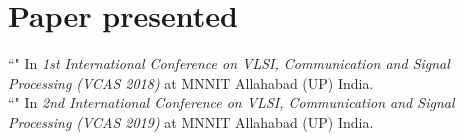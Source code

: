 \vspace{-2.5em}
\section{Paper presented}
``" In {\sl 1st International Conference on VLSI, Communication and Signal Processing (VCAS 2018)} at MNNIT Allahabad (UP) India. \\

\vspace{-1.5em}
``" In {\sl 2nd International Conference on VLSI, Communication and Signal Processing (VCAS 2019)} at MNNIT Allahabad (UP) India. \\
\vspace{-1em}
\sectionline